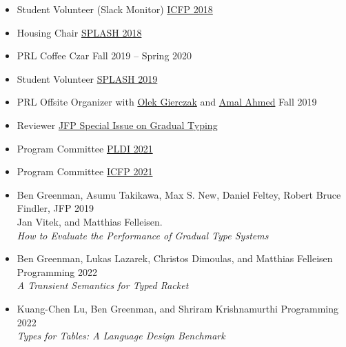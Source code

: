 \documentclass{article}
\begin{document}
\begin{itemize}
  \item {Student Volunteer (Slack Monitor)} \hfill \href{https://icfp18.sigplan.org/committee/icfp-2018-organizing-committee}{ICFP 2018}
  \item {Housing Chair} \hfill \href{https://2018.splashcon.org/committee/splash-2018-organizing-committee}{SPLASH 2018}
  \item {PRL Coffee Czar} \hfill {Fall 2019 -- Spring 2020}
  \item {Student Volunteer} \hfill \href{https://2019.splashcon.org/}{SPLASH 2019}
  \item {PRL Offsite Organizer} with \href{https://www.khoury.northeastern.edu/people/olek-gierczak/}{Olek Gierczak} and \href{http://ccs.neu.edu/home/amal/}{Amal Ahmed} \hfill {Fall 2019}
  \item {Reviewer} \hfill \href{https://www.cambridge.org/core/news/jfp-special-issue-on-gradual-typing}{JFP Special Issue on Gradual Typing}
  \item {Program Committee} \hfill \href{https://pldi21.sigplan.org/committee/pldi-2021-papers-program-committee}{PLDI 2021}
  \item {Program Committee} \hfill \href{https://icfp21.sigplan.org/committee/icfp-2021-papers-program-committee}{ICFP 2021}
\end{itemize}




\begin{itemize}
\item
  Ben Greenman, Asumu Takikawa, Max S. New, Daniel Feltey, Robert Bruce Findler, \hfill JFP 2019 \\
  Jan Vitek, and Matthias Felleisen. \\
  \emph{How to Evaluate the Performance of Gradual Type Systems}
\item
  Ben Greenman, Lukas Lazarek, Christos Dimoulas, and Matthias Felleisen \hfill Programming 2022 \\
  \emph{A Transient Semantics for Typed Racket}
\item
  Kuang-Chen Lu, Ben Greenman, and Shriram Krishnamurthi \hfill Programming 2022 \\
  \emph{Types for Tables: A Language Design Benchmark}
\end{itemize}
\end{document}
